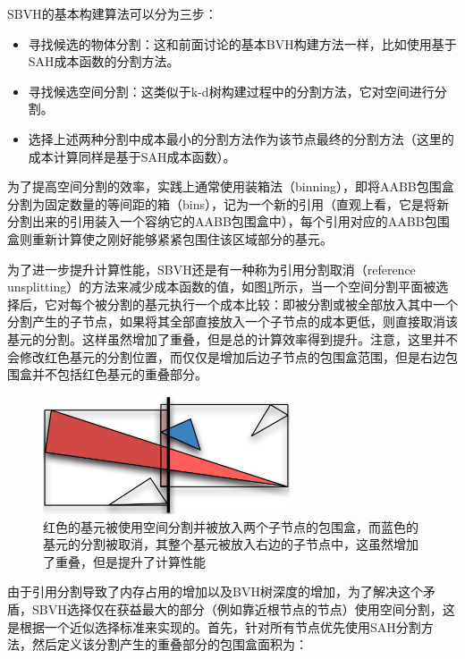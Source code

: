 SBVH的基本构建算法可以分为三步：

\begin{itemize}
	\item 寻找候选的物体分割：这和前面讨论的基本BVH构建方法一样，比如使用基于SAH成本函数的分割方法。
	\item 寻找候选空间分割：这类似于k-d树构建过程中的分割方法，它对空间进行分割。
	\item 选择上述两种分割中成本最小的分割方法作为该节点最终的分割方法（这里的成本计算同样是基于SAH成本函数）。
\end{itemize}

为了提高空间分割的效率，实践上通常使用装箱法（binning），即将AABB包围盒分割为固定数量的等间距的箱（bins），记为一个新的引用（直观上看，它是将新分割出来的引用装入一个容纳它的AABB包围盒中），每个引用对应的AABB包围盒则重新计算使之刚好能够紧紧包围住该区域部分的基元。

为了进一步提升计算性能，SBVH还是有一种称为引用分割取消（reference unsplitting）的方法来减少成本函数的值，如图\ref{f:pt-unsplitting}所示，当一个空间分割平面被选择后，它对每个被分割的基元执行一个成本比较：即被分割或被全部放入其中一个分割产生的子节点，如果将其全部直接放入一个子节点的成本更低，则直接取消该基元的分割。这样虽然增加了重叠，但是总的计算效率得到提升。注意，这里并不会修改红色基元的分割位置，而仅仅是增加后边子节点的包围盒范围，但是右边包围盒并不包括红色基元的重叠部分。

\begin{figure}
	\sidecaption
	\includegraphics[width=0.65\textwidth]{figures/pt/unsplitting}
	\caption{红色的基元被使用空间分割并被放入两个子节点的包围盒，而蓝色的基元的分割被取消，其整个基元被放入右边的子节点中，这虽然增加了重叠，但是提升了计算性能}
	\label{f:pt-unsplitting}
\end{figure}

由于引用分割导致了内存占用的增加以及BVH树深度的增加，为了解决这个矛盾，SBVH选择仅在获益最大的部分（例如靠近根节点的节点）使用空间分割，这是根据一个近似选择标准来实现的。首先，针对所有节点优先使用SAH分割方法，然后定义该分割产生的重叠部分的包围盒面积为：


